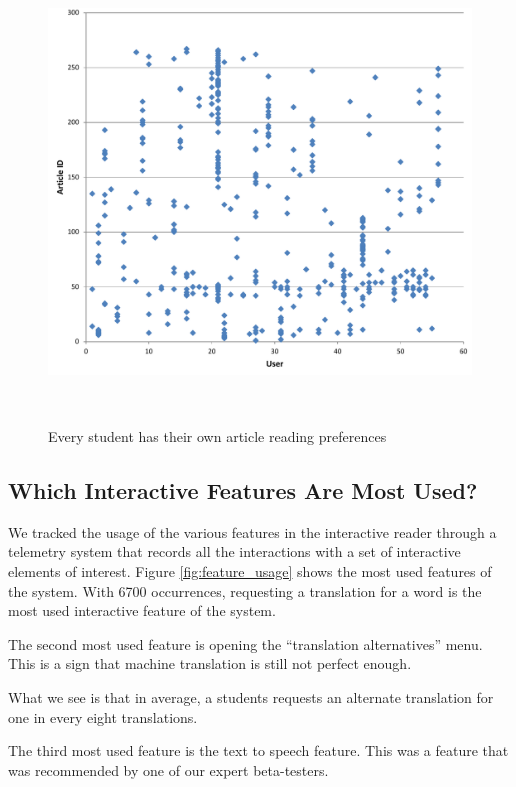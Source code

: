 \begin{figure}[h!]
\centering
  \includegraphics[width=\columnwidth]{figures/users_articles}
  \caption{Every student has their own article reading preferences}~\label{fig:registrations}
\end{figure}

\subsection{Which Interactive Features Are Most Used?}
We tracked the usage of the various features in the interactive reader through a telemetry system that records all the interactions with a set of interactive elements of interest. Figure \ref{fig:feature_usage} shows the most used features of the system. With 6700 occurrences, requesting a translation for a word is the most used interactive feature of the system. 

The second most used feature is opening the ``translation alternatives'' menu. This is a sign that machine translation is still not perfect enough. 

What we see is that in average, a students requests an alternate translation for one in every eight translations. 

The third most used feature is the text to speech feature. This was a feature that was recommended by one of our expert beta-testers. 

